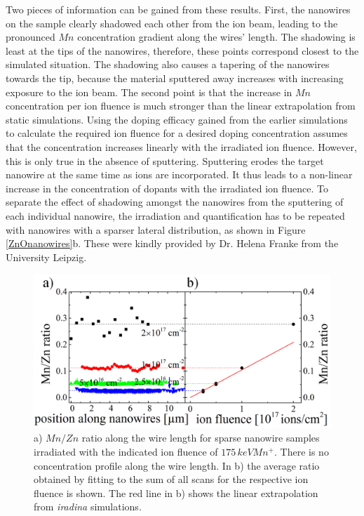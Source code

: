Two pieces of information can be gained from these results. First, the nanowires on the sample clearly shadowed each other from the ion beam, leading to the pronounced $Mn$ concentration gradient along the wires' length. The shadowing is least at the tips of the nanowires, therefore, these points correspond closest to the simulated situation. The shadowing also causes a tapering of the nanowires towards the tip, because the material sputtered away increases with increasing exposure to the ion beam. The second point is that the increase in $Mn$ concentration per ion fluence is much stronger than the linear extrapolation from static simulations. Using the doping efficacy gained from the earlier simulations to calculate the required ion fluence for a desired doping concentration assumes that the concentration increases linearly with the irradiated ion fluence. However, this is only true in the absence of sputtering. Sputtering erodes the target nanowire at the same time as ions are incorporated. It thus leads to a non-linear increase in the concentration of dopants with the irradiated ion fluence. To separate the effect of shadowing amongst the nanowires from the sputtering of each individual nanowire, the irradiation and quantification has to be repeated with nanowires with a sparser lateral distribution, as shown in Figure \ref{ZnOnanowires}b. These were kindly provided by Dr. Helena Franke from the University Leipzig.


\begin{figure}[th]
	\centering
		\includegraphics[width=.85\textwidth]{images/MnZn2.png}
	\caption{a) $Mn/Zn$ ratio along the wire length for sparse nanowire samples irradiated with the indicated ion fluence of $175\,keV Mn^+$. There is no concentration profile along the wire length. In b) the average ratio obtained by fitting to the sum of all scans for the respective ion fluence is shown. The red line in b) shows the linear extrapolation from \emph{iradina} simulations.}
	\label{MnZn2}
\end{figure} 

